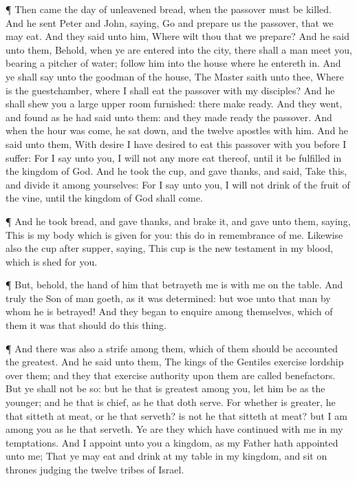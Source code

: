  ¶ Then came the day of unleavened bread, when the passover
must be killed.  And he sent Peter and John, saying, Go and
prepare us the passover, that we may eat.  And they said
unto him, Where wilt thou that we prepare?  And he said
unto them, Behold, when ye are entered into the city, there shall a man
meet you, bearing a pitcher of water; follow him into the house where he
entereth in.  And ye shall say unto the goodman of the
house, The Master saith unto thee, Where is the guestchamber, where I
shall eat the passover with my disciples?  And he shall
shew you a large upper room furnished: there make ready. 
And they went, and found as he had said unto them: and they made ready
the passover.  And when the hour was come, he sat down, and
the twelve apostles with him.  And he said unto them, With
desire I have desired to eat this passover with you before I suffer:
 For I say unto you, I will not any more eat thereof, until
it be fulfilled in the kingdom of God.  And he took the
cup, and gave thanks, and said, Take this, and divide it among
yourselves:  For I say unto you, I will not drink of the
fruit of the vine, until the kingdom of God shall come.

 ¶ And he took bread, and gave thanks, and brake it, and
gave unto them, saying, This is my body which is given for you: this do
in remembrance of me.  Likewise also the cup after supper,
saying, This cup is the new testament in my blood, which is shed for
you.

 ¶ But, behold, the hand of him that betrayeth me is with
me on the table.  And truly the Son of man goeth, as it was
determined: but woe unto that man by whom he is betrayed! 
And they began to enquire among themselves, which of them it was that
should do this thing.

 ¶ And there was also a strife among them, which of them
should be accounted the greatest.  And he said unto them,
The kings of the Gentiles exercise lordship over them; and they that
exercise authority upon them are called benefactors.  But
ye shall not be so: but he that is greatest among you, let him be as the
younger; and he that is chief, as he that doth serve.  For
whether is greater, he that sitteth at meat, or he that serveth? is not
he that sitteth at meat? but I am among you as he that serveth.
 Ye are they which have continued with me in my
temptations.  And I appoint unto you a kingdom, as my
Father hath appointed unto me;  That ye may eat and drink
at my table in my kingdom, and sit on thrones judging the twelve tribes
of Israel.

